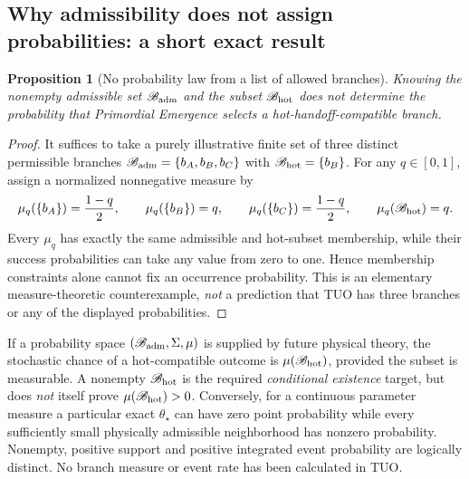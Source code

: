 \documentclass[11pt,a4paper]{article}
\theoremstyle{tmon}
\newtheorem{proposition}[theorem]{Proposition}
\theoremstyle{definition}
\begin{document}
\subsection{Why admissibility does not assign probabilities: a short exact result}
\begin{proposition}[No probability law from a list of allowed branches]\label{prop:c002measures}
Knowing the nonempty admissible set $\mathscr B_{\rm adm}$ and the subset $\mathscr B_{\rm hot}$ does not determine the probability that Primordial Emergence selects a hot-handoff-compatible branch.
\end{proposition}
\begin{proof}
It suffices to take a purely illustrative finite set of three distinct permissible branches $\mathscr B_{\rm adm}=\{b_A,b_B,b_C\}$ with $\mathscr B_{\rm hot}=\{b_B\}$. For any $q\in[0,1]$, assign a normalized nonnegative measure by
\begin{equation}\label{eq:c002finite}
\mu_q(\{b_A\})=\frac{1-q}{2},\qquad
\mu_q(\{b_B\})=q,\qquad
\mu_q(\{b_C\})=\frac{1-q}{2},\qquad
\mu_q(\mathscr B_{\rm hot})=q.
\end{equation}
Every $\mu_q$ has exactly the same admissible and hot-subset membership, while their success probabilities can take any value from zero to one. Hence membership constraints alone cannot fix an occurrence probability. This is an elementary measure-theoretic counterexample, \emph{not} a prediction that TUO has three branches or any of the displayed probabilities.
\end{proof}

If a probability space $(\mathscr B_{\rm adm},\Sigma,\mu)$ is supplied by future physical theory, the stochastic chance of a hot-compatible outcome is $\mu(\mathscr B_{\rm hot})$, provided the subset is measurable. A nonempty $\mathscr B_{\rm hot}$ is the required \emph{conditional existence} target, but does \emph{not} itself prove $\mu(\mathscr B_{\rm hot})>0$. Conversely, for a continuous parameter measure a particular exact $\theta_\star$ can have zero point probability while every sufficiently small physically admissible neighborhood has nonzero probability. Nonempty, positive support and positive integrated event probability are logically distinct. No branch measure or event rate has been calculated in TUO.
\end{document}

